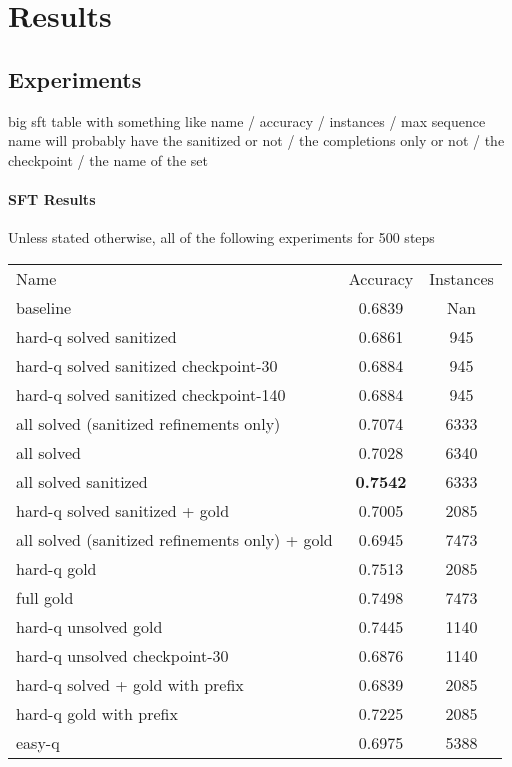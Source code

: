\documentclass[a4paper,10pt]{article}
\title{}
\author{Jose Rodriguez}
\begin{document}
\maketitle

\begin{abstract}

\end{abstract}

\section{Results}
\subsection{Experiments}
big sft table with something like name / accuracy / instances / max sequence
name will probably have the sanitized or not / the completions only or not / the checkpoint / the name of the set


\paragraph{SFT Results}
Unless stated otherwise, all of the following experiments for 500 steps

\begin{center}
\begin{tabular}{lcc}

Name & Accuracy & Instances \\
baseline & 0.6839 & Nan\\
hard-q solved sanitized& 0.6861 & 945\\
hard-q solved sanitized checkpoint-30 & 0.6884 & 945\\
hard-q solved sanitized checkpoint-140 & 0.6884 & 945\\
all solved (sanitized refinements only)& 0.7074 & 6333\\
all solved & 0.7028 & 6340\\
all solved sanitized & \textbf{0.7542}  & 6333\\
hard-q solved sanitized + gold & 0.7005  & 2085\\
all solved (sanitized refinements only) + gold & 0.6945 & 7473 \\
hard-q gold & 0.7513 & 2085 \\
full gold & 0.7498 & 7473 \\
hard-q unsolved gold & 0.7445 & 1140 \\
hard-q unsolved checkpoint-30 & 0.6876 & 1140 \\
hard-q solved + gold with prefix & 0.6839 & 2085 \\
hard-q gold with prefix & 0.7225 & 2085 \\
easy-q & 0.6975 & 5388 \\ 
\end{tabular}
\end{center}
\end{document}

